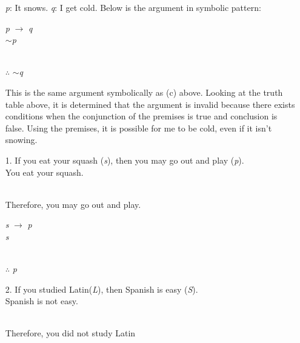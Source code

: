 \documentclass{article}
\begin{document}
\begin{itemize}
    \emph{p}: It snows. \emph{q}: I get cold.  Below is the argument in symbolic pattern:
    
    \hspace*{1cm} {\color{blue} \emph{p} $\to$ \emph{q}}\\
    \hspace*{1cm} {\color{blue} $\sim$\emph{p}}\\
    \\
    \hspace*{1cm} {\color{blue} $\therefore$ $\sim$\emph{q}}
    
    {\color{blue} This is the same argument symbolically as (c) above.  Looking at the truth table above, it is determined that the argument is invalid because there exists conditions when the conjunction of the premises is true and conclusion is false. Using the premises, it is possible for me to be cold, even if it isn't snowing.}
    
    \item[1.] If you eat your squash (\emph{s}), then you may go out and play (\emph{p}).\\
    You eat your squash.\\
    \\
    Therefore, you may go out and play.
    
    \hspace*{1cm} {\color{blue} \emph{s} $\to$ \emph{p}}\\
    \hspace*{1cm} {\color{blue} \emph{s}}\\
    \\
    \hspace*{1cm} {\color{blue} $\therefore$ \emph{p}}
    
    
    \item[2.] If you studied Latin(\emph{L}), then Spanish is easy (\emph{S}).\\
    Spanish is not easy.\\
    \\
    Therefore, you did not study Latin
    

\end{itemize}
\end{document}
